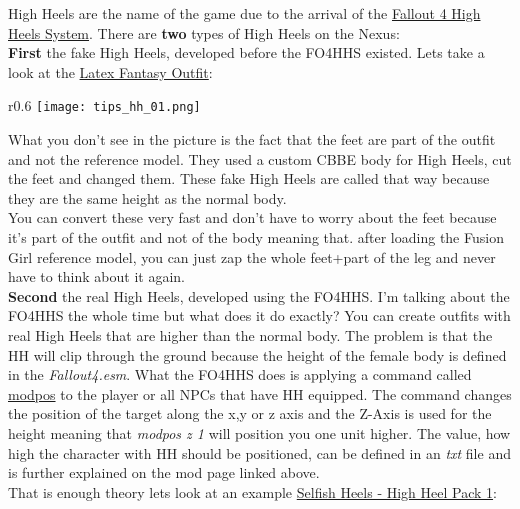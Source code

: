 High Heels are the name of the game due to the arrival of the \href{https://nexusmods.com/fallout4/mods/39850}{Fallout 4 High Heels System}.
There are \textbf{two} types of High Heels on the Nexus:\\
\textbf{First} the fake High Heels, developed before the FO4HHS existed. 
Lets take a look at the \href{https://www.nexusmods.com/fallout4/mods/39265}{Latex Fantasy Outfit}:
\begin{wrapfigure}[16]{r}{0.6\textwidth}
    \vspace{-12pt}
    \texttt{[image: tips\_hh\_01.png]}
\end{wrapfigure}
What you don't see in the picture is the fact that the feet are part of the outfit and not the reference model. They used a custom CBBE
body for High Heels, cut the feet and changed them. These fake High Heels are called that way because they are the same height as 
the normal body.\\
You can convert these very fast and don't have to worry about the feet because it's part of the outfit and not of the body meaning 
that. after loading the Fusion Girl reference model, you can just zap the whole feet+part of the leg and never have to think about it 
again.\\
\linebreak
\linebreak
\textbf{Second} the real High Heels, developed using the FO4HHS. I'm talking about the FO4HHS the whole time but what does it do exactly?
You can create outfits with real High Heels that are higher than the normal body. The problem is that the HH will clip through the ground 
because the height of the female body is defined in the \textit{Fallout4.esm}. What the FO4HHS does is applying a command called 
\href{https://falloutcheats.com/command/modpos}{modpos} to the player or all NPCs that have HH equipped. The command changes the position 
of the target along the x,y or z axis and the Z-Axis is used for the height meaning that \textit{modpos z 1} will position you one unit 
higher. The value, how high the character with HH should be positioned, can be defined in an \textit{txt} file and is further explained 
on the mod page linked above.\\
That is enough theory lets look at an example \href{https://www.nexusmods.com/fallout4/mods/39972}{Selfish Heels - High Heel Pack 1}:

